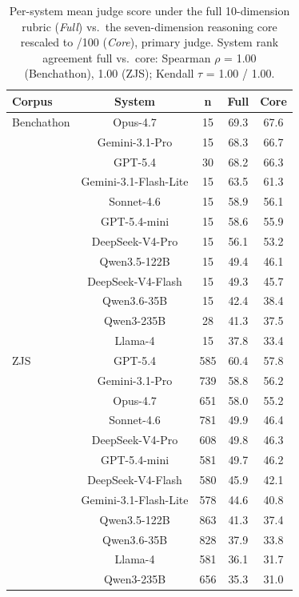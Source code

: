 \begin{table}[t]
\centering\footnotesize
\caption{Per-system mean judge score under the full 10-dimension rubric (\emph{Full}) vs.\ the seven-dimension reasoning core rescaled to /100 (\emph{Core}), primary judge. System rank agreement full vs.\ core: Spearman $\rho$ = 1.00 (Benchathon), 1.00 (ZJS); Kendall $\tau$ = 1.00 / 1.00.}
\label{tbl-reasoning-core}
\setlength{\tabcolsep}{3pt}
\begin{tabular*}{\columnwidth}{@{\extracolsep{\fill}}lcccc@{}}
\toprule
Corpus & System & n & Full & Core \\
\midrule
Benchathon & Opus-4.7 & 15 & 69.3 & 67.6 \\
 & Gemini-3.1-Pro & 15 & 68.3 & 66.7 \\
 & GPT-5.4 & 30 & 68.2 & 66.3 \\
 & Gemini-3.1-Flash-Lite & 15 & 63.5 & 61.3 \\
 & Sonnet-4.6 & 15 & 58.9 & 56.1 \\
 & GPT-5.4-mini & 15 & 58.6 & 55.9 \\
 & DeepSeek-V4-Pro & 15 & 56.1 & 53.2 \\
 & Qwen3.5-122B & 15 & 49.4 & 46.1 \\
 & DeepSeek-V4-Flash & 15 & 49.3 & 45.7 \\
 & Qwen3.6-35B & 15 & 42.4 & 38.4 \\
 & Qwen3-235B & 28 & 41.3 & 37.5 \\
 & Llama-4 & 15 & 37.8 & 33.4 \\
ZJS & GPT-5.4 & 585 & 60.4 & 57.8 \\
 & Gemini-3.1-Pro & 739 & 58.8 & 56.2 \\
 & Opus-4.7 & 651 & 58.0 & 55.2 \\
 & Sonnet-4.6 & 781 & 49.9 & 46.4 \\
 & DeepSeek-V4-Pro & 608 & 49.8 & 46.3 \\
 & GPT-5.4-mini & 581 & 49.7 & 46.2 \\
 & DeepSeek-V4-Flash & 580 & 45.9 & 42.1 \\
 & Gemini-3.1-Flash-Lite & 578 & 44.6 & 40.8 \\
 & Qwen3.5-122B & 863 & 41.3 & 37.4 \\
 & Qwen3.6-35B & 828 & 37.9 & 33.8 \\
 & Llama-4 & 581 & 36.1 & 31.7 \\
 & Qwen3-235B & 656 & 35.3 & 31.0 \\
\bottomrule
\end{tabular*}
\end{table}

